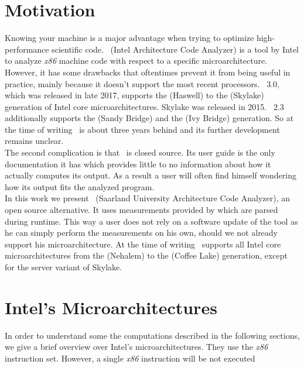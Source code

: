 
\section{Motivation}

Knowing your machine is a major advantage when trying to optimize high-performance scientific code. \iaca\ (Intel Architecture Code Analyzer) \cite{iaca} is a tool by Intel to analyze \emph{x86} machine code with respect to a specific microarchitecture. However, it has some drawbacks that oftentimes prevent it from being useful in practice, mainly because it doesn't support the most recent processors. \iaca\ $3.0$, which was released in late 2017, supports the  (Haswell) to the  (Skylake) generation of Intel core microarchitectures. Skylake was released in 2015. \iaca\ $2.3$ additionally supports the  (Sandy Bridge) and the  (Ivy Bridge) generation. So at the time of writing \iaca\ is about three years behind and its further development remains unclear.\\
The second complication is that \iaca\ is closed source. Its user guide \cite{userguide} is the only documentation it has which provides little to no information about how it actually computes its output. As a result a user will often find himself wondering how its output fits the analyzed program.\\
In this work we present \suaca\ (Saarland University Architecture Code Analyzer), an open source alternative. It uses measurements provided by \cite{Andreas} which are parsed during runtime. This way a user does not rely on a software update of the tool as he can simply perform the measurements on his own, should we not already support his microarchitecture. At the time of writing \suaca\ supports all Intel core microarchitectures from the  (Nehalem) to the  (Coffee Lake) generation, except for the server variant of Skylake.
\newpage

\section{Intel's Microarchitectures}


In order to understand some the computations described in the following sections, we give a brief overview over Intel's microarchitectures. They use the \emph{x86} instruction set. However, a single \emph{x86} instruction will be not executed



